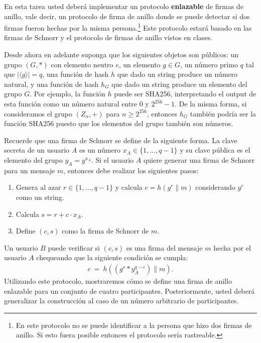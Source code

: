 En esta tarea usted deberá implementar un protocolo \textbf{enlazable} de firmas de
anillo, vale decir, un protocolo de firma de anillo donde se puede detectar si dos firmas
fueron hechas por la misma persona.\footnote{En este protocolo no se puede identificar a la persona
que hizo dos firmas de anillo. Si esto fuera posible entonces el protocolo sería rastreable.} Este protocolo
estará basado en las firmas de Schnorr y el protocolo de
firmas de anillo vistos en clases.

Desde ahora en adelante suponga que los siguientes objetos son públicos: un grupo $(G, *)$ con elemento neutro $e$,
un elemento $g \in G$, un número primo $q$ tal que $|\langle
g\rangle| = q$, una función de hash $h$ que dado un string produce un número natural, y una función de hash $h_G$ que
dado un string produce un elemento del grupo $G$. Por ejemplo, la función $h$ puede ser SHA256, interpretando el output de esta función como un número natural entre $0$ y $2^{256}-1$. De la misma forma, si consideramos el grupo $(Z_n, +)$ para
$n \geq 2^{256}$, entonces $h_G$ también podría ser la función SHA256 puesto que los elementos del grupo también son números.

Recuerde que una firma de Schnorr se define de la siguiente
forma.  La clave secreta de un
usuario $A$ es un número $x_A \in \{1, \ldots, q -1\}$ y su clave
pública es el elemento del grupo $y_A = g^{x_A}$. Si el
usuario $A$ quiere generar una firma de Schnorr para un mensaje $m$,
entonces debe realizar los siguientes pasos:
\begin{enumerate}
\item Genera al azar $r \in \{1, \ldots, q-1\}$ y calcula $c = h(g^r \| m)$ considerando
$g^r$ como un string.

\item Calcula $s = r + c \cdot x_A$.

\item Define $(c, s)$ como la firma de Schnorr de $m$.
\end{enumerate}
Un usuario $B$ puede verificar si $(c,s)$ es una firma del mensaje
$m$ hecha por el usuario $A$ chequeando que la siguiente condición se
cumpla:
\begin{align*}
c \ = \ h((g^s * y_A^{q-c}) \| m).
\end{align*}
Utilizando este protocolo, mostraremos cómo se define una firma de anillo enlazable para un
conjunto de cuatro participantes. Posteriormente, usted deberá generalizar la construcción al
caso de un número arbitrario de participantes.

